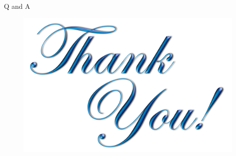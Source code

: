 \documentclass[xcolor={table}]{beamer}
\begin{document}
\begin{frame}{Q and A}
    

\vspace{0.5 cm}
\begin{figure}[h]
\centering
\includegraphics[scale=0.1]{thank you.png}

\end{figure}


			
			


\end{frame}



\end{document}
